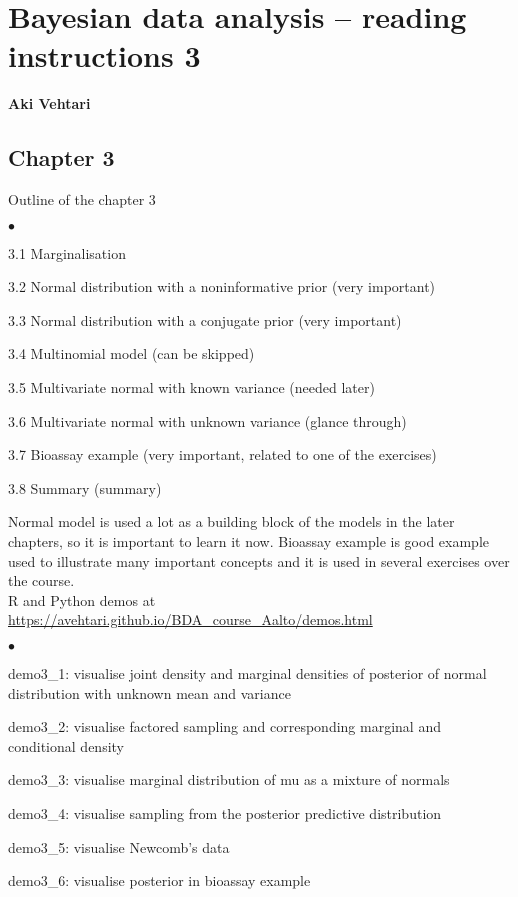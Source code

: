 \documentclass[a4paper,11pt,english]{article}
\begin{document}
\thispagestyle{empty}

\section*{Bayesian data analysis -- reading instructions 3} 
\smallskip
{\bf Aki Vehtari}
\smallskip

\subsection*{Chapter 3}

Outline of the chapter 3
\begin{list}{$\bullet$}{\parsep=0pt\itemsep=2pt}
\item 3.1 Marginalisation
\item 3.2 Normal distribution with a noninformative prior (very important)
\item 3.3 Normal distribution with a conjugate prior (very important)
\item {\color{gray}3.4 Multinomial model (can be skipped)}
\item 3.5 Multivariate normal with known variance (needed later)
\item 3.6 Multivariate normal with unknown variance (glance through)
\item 3.7 Bioassay example (very important, related to one of the exercises)
\item 3.8 Summary (summary)
\end{list}

Normal model is used a lot as a building block of the models in the
later chapters, so it is important to learn it now.
Bioassay example is good example used to illustrate many important
concepts and it is used in several exercises over the course.\\

R and Python demos at \url{https://avehtari.github.io/BDA_course_Aalto/demos.html}
\begin{list}{$\bullet$}{\parsep=0pt\itemsep=2pt}
\item demo3\_1: visualise joint density and marginal densities of
  posterior of normal distribution with unknown mean and variance
\item demo3\_2: visualise factored sampling and corresponding
  marginal and conditional density
\item demo3\_3: visualise marginal distribution of mu as a mixture of normals
\item demo3\_4: visualise sampling from the posterior predictive distribution
\item demo3\_5: visualise Newcomb's data
\item demo3\_6: visualise posterior in bioassay example
\end{list}
\end{document}
